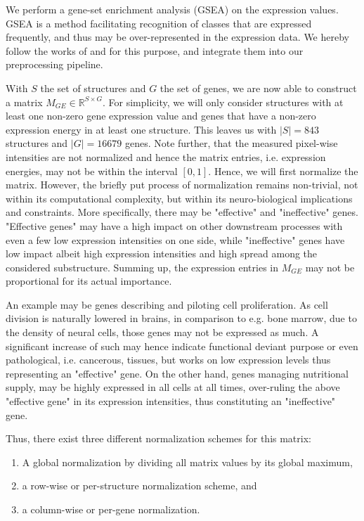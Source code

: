 \documentclass[]{article}
\begin{document}
We perform a gene-set enrichment analysis (GSEA) on the expression values. GSEA is a method facilitating recognition of classes that are expressed frequently, and thus may be over-represented in the expression data. We hereby follow the works of \citet{subramanian2007gsea} and \citet{kuleshov2016enrichr} for this purpose, and integrate them into our preprocessing pipeline.

With $S$ the set of structures and $G$ the set of genes, we are now able to construct a matrix $M_{GE}\in \mathbb{R}^{S\times G}$. For simplicity, we will only consider structures with at least one non-zero gene expression value and genes that have a non-zero expression energy in at least one structure. This leaves us with $|S|=843$ structures and $|G|=16679$ genes. Note further, that the measured pixel-wise intensities are not normalized and hence the matrix entries, i.e. expression energies, may not be within the interval $[0,1]$. Hence, we will first normalize the matrix. 
However, the briefly put process of normalization remains non-trivial, not within its computational complexity, but within its neuro-biological implications and constraints. More specifically, there may be "effective" and "ineffective" genes. "Effective genes" may have a high impact on other downstream processes with even a few low expression intensities on one side, while "ineffective" genes have low impact albeit high expression intensities and high spread among the considered substructure. Summing up, the expression entries in $M_{GE}$ may not be proportional for its actual importance. 

An example may be genes describing and piloting cell proliferation. As cell division is naturally lowered in brains, in comparison to e.g. bone marrow, due to the density of neural cells, those genes may not be expressed as much. A significant increase of such may hence indicate functional deviant purpose or even pathological, i.e. cancerous, tissues, but works on low expression levels thus representing an "effective" gene. On the other hand, genes managing nutritional supply, may be highly expressed in all cells at all times, over-ruling the above "effective gene" in its expression intensities, thus constituting an "ineffective" gene.

Thus, there exist three different normalization schemes for this matrix: 
\begin{enumerate}
	\item A global normalization by dividing all matrix values by its global maximum, 
	\item a row-wise or per-structure normalization scheme, and
	\item a column-wise or per-gene normalization.
\end{enumerate}
\end{document}
